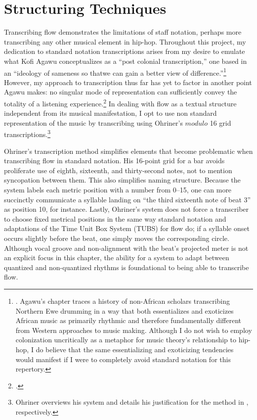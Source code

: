 \section{Structuring Techniques}
Transcribing flow demonstrates the limitations of staff notation, perhaps more transcribing any other
musical element in hip-hop. Throughout this project, my dedication to standard notation transcriptions
arises from my desire to emulate what Kofi Agawu conceptualizes as a ``post  colonial transcription,''
one based in an ``ideology of sameness so that\textellipsis we can gain a better view of 
difference.''\footnote{
    \autocite[67]{kofiagawuInventionAfricanRhythm2003}. Agawu's chapter traces a history of 
    non-African scholars transcribing Northern Ewe drumming in a way that both essentializes
    and exoticizes African music as primarily rhythmic and therefore fundamentally different
    from Western approaches to music making. Although I do not wish to employ colonization 
    uncritically as a metaphor for music theory's relationship to hip-hop, I do believe that
    the same essentializing and exoticizing tendencies would manifest if I were to completely
    avoid standard notation for this repertory.}
However, my approach to transcription thus far has yet to factor in another point Agawu makes: no
singular mode of representation can sufficiently convey the totality of a listening 
experience.\footnote{
    \autocite[187]{kofiagawuAfricanRhythmNorthern1995}.}
In dealing with flow as a textual structure independent from its musical manifestation, 
I opt to use non standard representation of the music by transcribing using Ohriner's $modulo$ 16
grid transcriptions.\footnote{
    Ohriner overviews his system and details his justification for the method in 
    \autocite[xxviii--xl and 7--9]{mitchellohrinerFlowRhythmicVoice2019}, respectively.}

Ohriner's transcription method simplifies elements that become problematic when transcribing flow
in standard notation. His 16-point grid for a bar avoids proliferate use of eighth, sixteenth, and
thirty-second notes, not to mention syncopation between them. This also simplifies naming structure.
Because the system labels each metric position with a number from 0--15, one can more succinctly 
communicate a syllable landing on ``the third sixteenth note of beat 3'' as position 10, for instance.
Lastly, Ohriner's system does not force a transcriber to choose fixed metrical positions in the same
way standard notation and adaptations of the Time Unit Box System (TUBS) for flow do; if a syllable 
onset occurs slightly before the beat, one simply moves the corresponding circle. Although vocal
groove and non-alignment with the beat's projected meter is not an explicit focus in this chapter,
the ability for a system to adapt between quantized and non-quantized rhythms is foundational to 
being able to transcribe flow.


